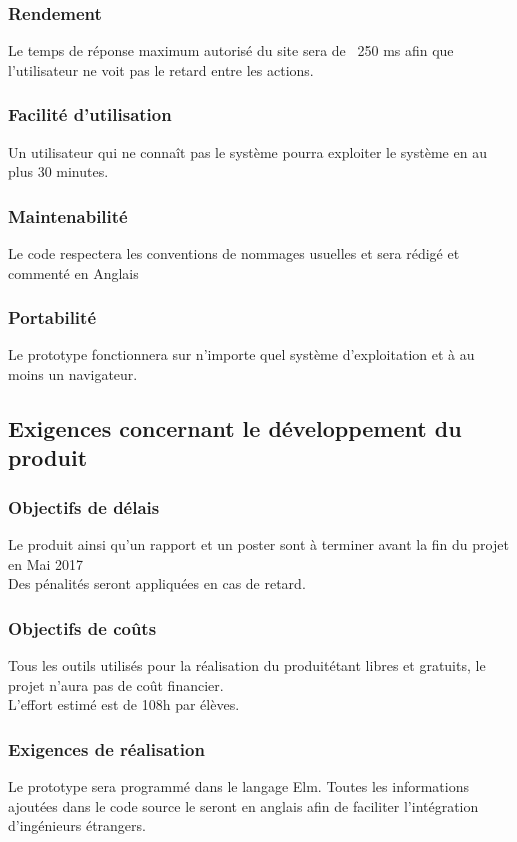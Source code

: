 \documentclass[majeure,gl]{tb}
\begin{document}
\subsubsection{Rendement}
Le temps de réponse maximum autorisé du site sera de ~250 ms afin que l’utilisateur ne voit pas le retard entre les actions.

\subsubsection{Facilité d'utilisation}
Un utilisateur qui ne connaît pas le système pourra exploiter le système en au plus 30 minutes.


\subsubsection{Maintenabilité}
Le code respectera les conventions de nommages usuelles et sera rédigé et commenté en Anglais


\subsubsection{Portabilité}
Le prototype fonctionnera sur n'importe quel système d'exploitation et à au moins un navigateur.

\subsection{Exigences concernant le développement du produit}
\label{exigences}

\subsubsection{Objectifs de délais}
Le produit ainsi qu’un rapport et un poster sont à terminer avant la fin du projet en Mai 2017 \\
Des pénalités seront appliquées en cas de retard.

\subsubsection{Objectifs de coûts}
Tous les outils utilisés pour la réalisation du produitétant libres et gratuits, le projet n’aura pas de coût financier. \\
L’effort estimé est de 108h par élèves.

\subsubsection{Exigences de réalisation}
Le prototype sera programmé dans le langage Elm.
 Toutes les informations ajoutées dans le code
source le seront en anglais afin de faciliter l'intégration
d'ingénieurs étrangers.
\end{document}
